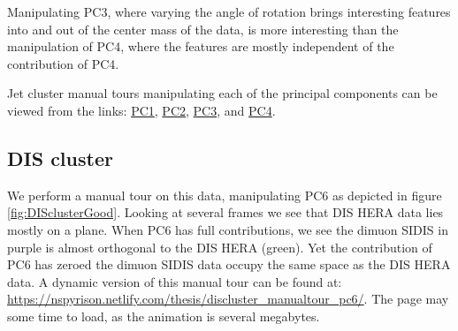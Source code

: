 \documentclass{monashthesis}
\begin{document}
Manipulating PC3, where varying the angle of rotation brings interesting features into and out of the center mass of the data, is more interesting than the manipulation of PC4, where the features are mostly independent of the contribution of PC4.

Jet cluster manual tours manipulating each of the principal components can be viewed from the links: \href{https://nspyrison.netlify.com/thesis/jetcluster_manualtour_pc1/}{PC1}, \href{https://nspyrison.netlify.com/thesis/jetcluster_manualtour_pc2/}{PC2}, \href{https://nspyrison.netlify.com/thesis/jetcluster_manualtour_pc3/}{PC3}, and \href{https://nspyrison.netlify.com/thesis/jetcluster_manualtour_pc4/}{PC4}.

\hypertarget{dis-cluster}{%
\subsection{DIS cluster}\label{dis-cluster}}

We perform a manual tour on this data, manipulating PC6 as depicted in figure \ref{fig:DISclusterGood}. Looking at several frames we see that DIS HERA data lies mostly on a plane. When PC6 has full contributions, we see the dimuon SIDIS in purple is almost orthogonal to the DIS HERA (green). Yet the contribution of PC6 has zeroed the dimuon SIDIS data occupy the same space as the DIS HERA data. A dynamic version of this manual tour can be found at:
\url{https://nspyrison.netlify.com/thesis/discluster_manualtour_pc6/}.
The page may some time to load, as the animation is several megabytes.
\end{document}
